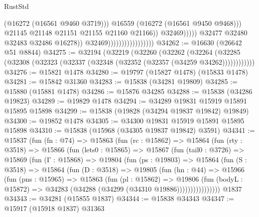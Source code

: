 \begin{lexlean}{RustStd}
\begin{coremodule}
                                                            (@16272 (@16561 @9460 @3719)))
                                                          @16559
                                                          (@16272 (@16561 @9450 @9468)))
                                                        @21145
                                                        @21148
                                                        @21151
                                                        @21155
                                                        @21160
                                                        @21166))
                                                    @32469)))))
                                          @32477
                                          @32480
                                          @32483
                                          @32486
                                          @16278))
                                      @32469)))))))))))))))))
@34262 := @16630 (@26642 @51 @8844)
@34275 := @32194
    (@32219
      (@32260
        (@32262
          (@32264 (@32285 (@32308 (@32323 (@32337 (@32348 (@32352 (@32357 (@34259 @34262))))))))))))
@34276 := @15821 @1478
@34280 := @19797 (@15827 @1478) (@15833 @1478)
@34281 := @15842 @31360
@34283 := @15838 (@34281 @19809)
@34285 := @15880 (@15881 @1478)
@34286 := @15876 @34285
@34288 := @15838 (@34286 @19823)
@34289 := @19829 @1478
@34294 := @34289 @19831 @15919 @15891 @15895 @15898
@34299 := @15838 (@19828 (@34294 @19837 @19842) @19849)
@34300 := @19852 @1478
@34305 := @34300 @19831 @15919 @15891 @15895 @15898
@34310 := @15838 (@15968 (@34305 @19837 @19842) @3591)
@34341 := @15837
    (fun (fn : @74) =>
    @15863
      (fun (rc : @15862) =>
      @15864
        (fun (rty : @3518) =>
        @15866
          (fun (lets0 : @15865) =>
          @15867
            (fun (tail0 : @3726) =>
            @15869
              (fun (Γ : @15868) =>
              @19804
                (fun (ps : @19803) =>
                @15864
                  (fun (S : @3518) =>
                  @15864
                    (fun (D : @3518) =>
                    @19805
                      (fun (hn : @44) =>
                      @15966
                        (fun (pns : @15965) =>
                        @15863
                          (fun (pl : @15862) =>
                          @19806
                            (fun (bodyL : @15872) =>
                            @34283 (@34288 (@34299 (@34310 @19886))))))))))))))))
    @1837
@34343 := @34281 (@15855 @1837)
@34344 := @15838 @34343
@34347 := @15917 (@15918 @1837) @31363

\end{coremodule}
\end{lexlean}
